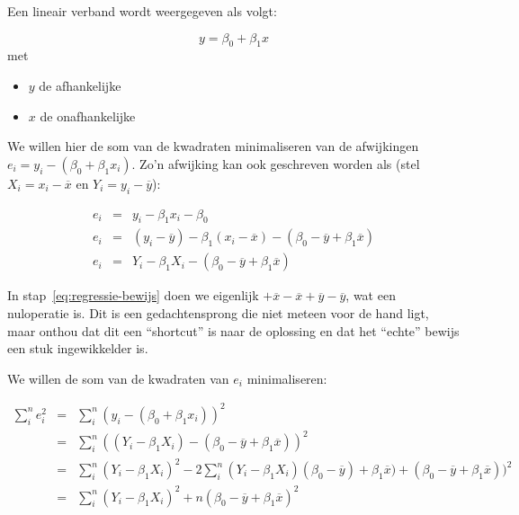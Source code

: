 \begin{theorem}

  Een lineair verband wordt weergegeven als volgt:

  \begin{equation}
    y = \beta_{0} + \beta_{1} x
    \label{eq:lineair}
  \end{equation}
  met
  \begin{itemize}
    \item $y$ de afhankelijke
    \item $x$ de onafhankelijke
  \end{itemize}

  We willen hier de som van de kwadraten minimaliseren van de afwijkingen $e_{i} = y_{i} - (\beta_{0} + \beta_{1}x_{i})$. Zo'n afwijking kan ook geschreven worden als (stel $X_{i} = x_{i} - \overline{x}$ en $Y_{i} = y_{i} - \overline{y}$):

  \begin{eqnarray}
    e_{i} & = & y_{i} - \beta_{1} x_{i} - \beta_{0} \\
    e_{i} & = & (y_{i} - \overline{y}) - \beta_{1}(x_{i} - \overline{x}) - (\beta_{0} - \overline{y} + \beta_{1} \overline{x}) \\
    \label{eq:regressie-bewijs}
    e_{i} & = & Y_{i} - \beta_{1} X_{i} - (\beta_{0} - \overline{y} + \beta_{1} \overline{x})
  \end{eqnarray}

  In stap~\ref{eq:regressie-bewijs} doen we eigenlijk $+\overline{x}-\overline{x}+\overline{y}-\overline{y}$, wat een nuloperatie is. Dit is een gedachtensprong die niet meteen voor de hand ligt, maar onthou dat dit een ``shortcut'' is naar de oplossing en dat het ``echte'' bewijs een stuk ingewikkelder is.

  We willen de som van de kwadraten van $e_i$  minimaliseren:

  \begin{eqnarray}
    \sum_{i}^{n} e_{i}^{2} & =& \sum_{i}^{n} (y_{i} - (\beta_{0} + \beta_{1}x_{i}))^{2}\\
    & = & \sum_{i}^{n} ((Y_{i} - \beta_{1} X_{i}) - (\beta_{0} - \overline{y} + \beta_{1}\overline{x}))^{2}\\
    & = & \sum_{i}^{n}(Y_{i} - \beta_{1} X_{i})^2 - 2 \sum_{i}^{n}(Y_i - \beta_1 X_i)(\beta_0 - \overline{y})+ \beta_1\overline{x}) + (\beta_{0} - \overline{y} + \beta_{1}\overline{x}))^{2} \label{eq:stap1}\\
    & = & \sum_{i}^{n}(Y_{i} - \beta_{1} X_{i})^{2} + n(\beta_{0} - \overline{y} + \beta_{1} \overline{x})^{2} \label{eq:stap2}
  \end{eqnarray}
	

\end{theorem}
